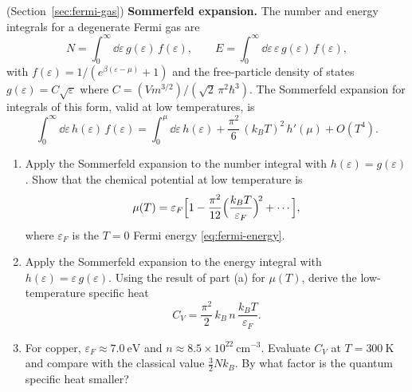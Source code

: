 \begin{problemset}
\item (Section~\ref{sec:fermi-gas}) \textbf{Sommerfeld expansion.}
    The number and energy integrals for a degenerate Fermi gas are
    \begin{equation*}
        N = \int_0^\infty\!\dd\varepsilon\,g(\varepsilon)\,f(\varepsilon),
        \qquad
        E = \int_0^\infty\!\dd\varepsilon\,\varepsilon\,g(\varepsilon)\,f(\varepsilon),
    \end{equation*}
    with $f(\varepsilon) = 1/(e^{\beta(\varepsilon - \mu)} + 1)$ and the free-particle density of states $g(\varepsilon) = C\sqrt{\varepsilon}$ where $C = (V m^{3/2})/(\sqrt{2}\,\pi^2\hbar^3)$. The Sommerfeld expansion for integrals of this form, valid at low temperatures, is
    \begin{equation*}
        \int_0^\infty\!\dd\varepsilon\,h(\varepsilon)\,f(\varepsilon)
        = \int_0^\mu\!\dd\varepsilon\,h(\varepsilon)
          + \frac{\pi^2}{6}\,(k_B T)^2\,h'(\mu) + O(T^4).
    \end{equation*}
    \begin{enumerate}
        \item[(a)] Apply the Sommerfeld expansion to the number integral with $h(\varepsilon) = g(\varepsilon)$. Show that the chemical potential at low temperature is
        \begin{equation*}
            \mu(T) = \varepsilon_F\Bigl[1 - \frac{\pi^2}{12}\Bigl(\frac{k_B T}{\varepsilon_F}\Bigr)^{\!2} + \cdots\Bigr],
        \end{equation*}
        where $\varepsilon_F$ is the $T = 0$ Fermi energy \eqref{eq:fermi-energy}.
        \item[(b)] Apply the Sommerfeld expansion to the energy integral with $h(\varepsilon) = \varepsilon\,g(\varepsilon)$. Using the result of part (a) for $\mu(T)$, derive the low-temperature specific heat
        \begin{equation*}
            C_V = \frac{\pi^2}{2}\,k_B\,n\,\frac{k_B T}{\varepsilon_F}.
        \end{equation*}
        \item[(c)] For copper, $\varepsilon_F \approx 7.0\ \text{eV}$ and $n \approx 8.5 \times 10^{22}\ \text{cm}^{-3}$. Evaluate $C_V$ at $T = 300\ \text{K}$ and compare with the classical value $\frac{3}{2}N k_B$. By what factor is the quantum specific heat smaller?
    \end{enumerate}


\end{problemset}
